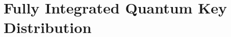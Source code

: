 %
% 
\graphicspath{{./chapters/chapter05/fig05/}}

\let\textcircled=\pgftextcircled
\chapter{Fully Integrated Quantum Key Distribution}
\label{chap:node}


